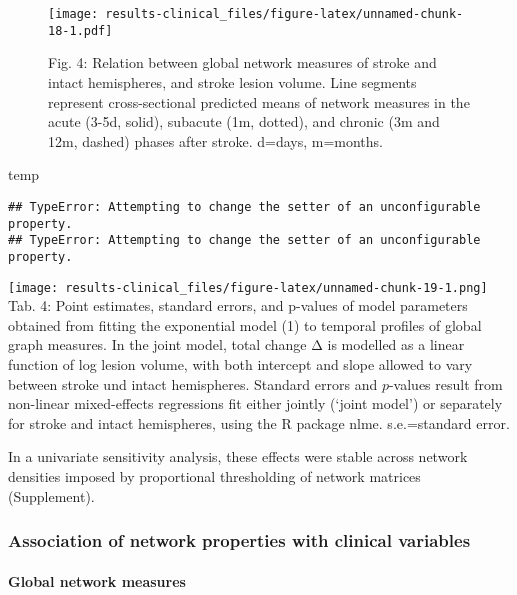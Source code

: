 \documentclass[]{article}
\newenvironment{Shaded}{\begin{snugshade}}{\end{snugshade}}
\newcommand{\NormalTok}[1]{#1}
\let\oldparagraph\paragraph
\renewcommand{\paragraph}[1]{\oldparagraph{#1}\mbox{}}
\begin{document}
\begin{figure}
\centering
\texttt{[image: results-clinical\_files/figure-latex/unnamed-chunk-18-1.pdf]}
\caption{Fig. 4: Relation between global network measures of stroke and
intact hemispheres, and stroke lesion volume. Line segments represent
cross-sectional predicted means of network measures in the acute (3-5d,
solid), subacute (1m, dotted), and chronic (3m and 12m, dashed) phases
after stroke. d=days, m=months.}
\end{figure}

\begin{Shaded}
\begin{Highlighting}[]
\NormalTok{temp}
\end{Highlighting}
\end{Shaded}

\begin{verbatim}
## TypeError: Attempting to change the setter of an unconfigurable property.
## TypeError: Attempting to change the setter of an unconfigurable property.
\end{verbatim}

\texttt{[image: results-clinical\_files/figure-latex/unnamed-chunk-19-1.png]}
Tab. 4: Point estimates, standard errors, and p-values of model
parameters obtained from fitting the exponential model (1) to temporal
profiles of global graph measures. In the joint model, total change Δ is
modelled as a linear function of log lesion volume, with both intercept
and slope allowed to vary between stroke und intact hemispheres.
Standard errors and \(p\)-values result from non-linear mixed-effects
regressions fit either jointly (`joint model') or separately for stroke
and intact hemispheres, using the R package nlme. s.e.=standard error.

In a univariate sensitivity analysis, these effects were stable across
network densities imposed by proportional thresholding of network
matrices (Supplement).

\hypertarget{association-of-network-properties-with-clinical-variables}{%
\subsubsection{Association of network properties with clinical
variables}\label{association-of-network-properties-with-clinical-variables}}

\hypertarget{global-network-measures}{%
\paragraph{Global network measures}\label{global-network-measures}}
\end{document}
